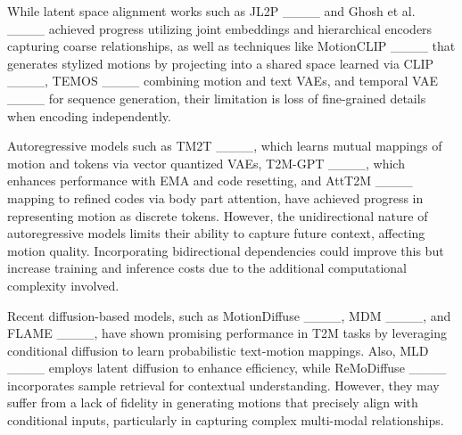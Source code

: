 While latent space alignment works such as JL2P ____ and Ghosh et al. ____ achieved progress utilizing joint embeddings and hierarchical encoders capturing coarse relationships, as well as techniques like MotionCLIP ____ that generates stylized motions by projecting into a shared space learned via CLIP ____, TEMOS ____ combining motion and text VAEs, and temporal VAE ____ for sequence generation, their limitation is loss of fine-grained details when encoding independently. 

Autoregressive models such as TM2T ____, which learns mutual mappings of motion and tokens via vector quantized VAEs, T2M-GPT ____, which enhances performance with EMA and code resetting, and AttT2M ____ mapping to refined codes via body part attention, have achieved progress in representing motion as discrete tokens. However, the unidirectional nature of autoregressive models limits their ability to capture future context, affecting motion quality. Incorporating bidirectional dependencies could improve this but increase training and inference costs due to the additional computational complexity involved.

Recent diffusion-based models, such as MotionDiffuse ____, MDM ____, and FLAME ____, have shown promising performance in T2M tasks by leveraging conditional diffusion to learn probabilistic text-motion mappings. Also, MLD ____ employs latent diffusion to enhance efficiency, while ReMoDiffuse ____ incorporates sample retrieval for contextual understanding. However, they may suffer from a lack of fidelity in generating motions that precisely align with conditional inputs, particularly in capturing complex multi-modal relationships. 


